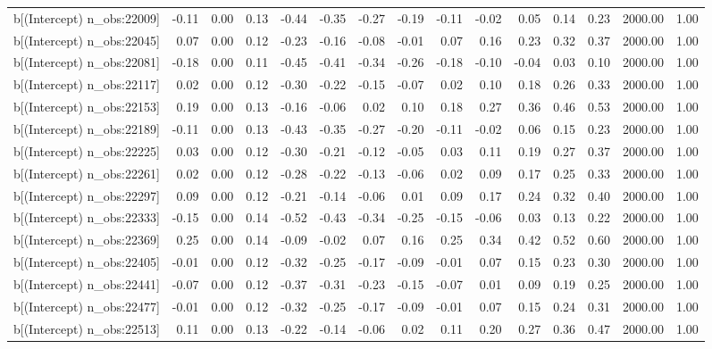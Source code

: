 \begin{table}[ht]
\begin{tabular}{rrrrrrrrrrrrrrr}
  b[(Intercept) n\_obs:22009] & -0.11 & 0.00 & 0.13 & -0.44 & -0.35 & -0.27 & -0.19 & -0.11 & -0.02 & 0.05 & 0.14 & 0.23 & 2000.00 & 1.00 \\ 
  b[(Intercept) n\_obs:22045] & 0.07 & 0.00 & 0.12 & -0.23 & -0.16 & -0.08 & -0.01 & 0.07 & 0.16 & 0.23 & 0.32 & 0.37 & 2000.00 & 1.00 \\ 
  b[(Intercept) n\_obs:22081] & -0.18 & 0.00 & 0.11 & -0.45 & -0.41 & -0.34 & -0.26 & -0.18 & -0.10 & -0.04 & 0.03 & 0.10 & 2000.00 & 1.00 \\ 
  b[(Intercept) n\_obs:22117] & 0.02 & 0.00 & 0.12 & -0.30 & -0.22 & -0.15 & -0.07 & 0.02 & 0.10 & 0.18 & 0.26 & 0.33 & 2000.00 & 1.00 \\ 
  b[(Intercept) n\_obs:22153] & 0.19 & 0.00 & 0.13 & -0.16 & -0.06 & 0.02 & 0.10 & 0.18 & 0.27 & 0.36 & 0.46 & 0.53 & 2000.00 & 1.00 \\ 
  b[(Intercept) n\_obs:22189] & -0.11 & 0.00 & 0.13 & -0.43 & -0.35 & -0.27 & -0.20 & -0.11 & -0.02 & 0.06 & 0.15 & 0.23 & 2000.00 & 1.00 \\ 
  b[(Intercept) n\_obs:22225] & 0.03 & 0.00 & 0.12 & -0.30 & -0.21 & -0.12 & -0.05 & 0.03 & 0.11 & 0.19 & 0.27 & 0.37 & 2000.00 & 1.00 \\ 
  b[(Intercept) n\_obs:22261] & 0.02 & 0.00 & 0.12 & -0.28 & -0.22 & -0.13 & -0.06 & 0.02 & 0.09 & 0.17 & 0.25 & 0.33 & 2000.00 & 1.00 \\ 
  b[(Intercept) n\_obs:22297] & 0.09 & 0.00 & 0.12 & -0.21 & -0.14 & -0.06 & 0.01 & 0.09 & 0.17 & 0.24 & 0.32 & 0.40 & 2000.00 & 1.00 \\ 
  b[(Intercept) n\_obs:22333] & -0.15 & 0.00 & 0.14 & -0.52 & -0.43 & -0.34 & -0.25 & -0.15 & -0.06 & 0.03 & 0.13 & 0.22 & 2000.00 & 1.00 \\ 
  b[(Intercept) n\_obs:22369] & 0.25 & 0.00 & 0.14 & -0.09 & -0.02 & 0.07 & 0.16 & 0.25 & 0.34 & 0.42 & 0.52 & 0.60 & 2000.00 & 1.00 \\ 
  b[(Intercept) n\_obs:22405] & -0.01 & 0.00 & 0.12 & -0.32 & -0.25 & -0.17 & -0.09 & -0.01 & 0.07 & 0.15 & 0.23 & 0.30 & 2000.00 & 1.00 \\ 
  b[(Intercept) n\_obs:22441] & -0.07 & 0.00 & 0.12 & -0.37 & -0.31 & -0.23 & -0.15 & -0.07 & 0.01 & 0.09 & 0.19 & 0.25 & 2000.00 & 1.00 \\ 
  b[(Intercept) n\_obs:22477] & -0.01 & 0.00 & 0.12 & -0.32 & -0.25 & -0.17 & -0.09 & -0.01 & 0.07 & 0.15 & 0.24 & 0.31 & 2000.00 & 1.00 \\ 
  b[(Intercept) n\_obs:22513] & 0.11 & 0.00 & 0.13 & -0.22 & -0.14 & -0.06 & 0.02 & 0.11 & 0.20 & 0.27 & 0.36 & 0.47 & 2000.00 & 1.00 \\ 

\end{tabular}
\end{table}
